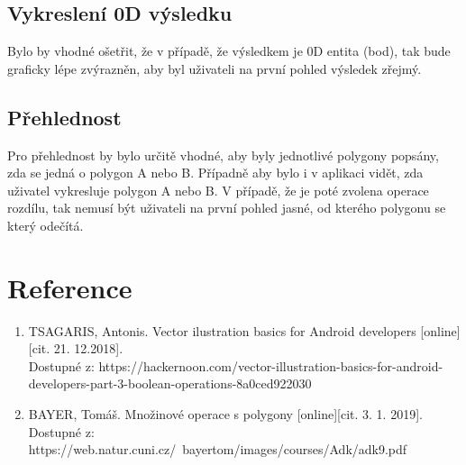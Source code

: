 \documentclass[a4paper, 12pt]{article}
\begin{document}
\subsection{Vykreslení 0D výsledku}
Bylo by vhodné ošetřit, že v případě, že výsledkem je 0D entita (bod), tak bude graficky lépe zvýrazněn, aby byl uživateli na první pohled výsledek zřejmý.

\subsection{Přehlednost}
Pro přehlednost by bylo určitě vhodné, aby byly jednotlivé polygony popsány, zda se jedná o polygon A nebo B. Případně aby bylo i v aplikaci vidět, zda uživatel vykresluje polygon A nebo B. V případě, že je poté zvolena operace rozdílu, tak nemusí být uživateli na první pohled jasné, od kterého polygonu se který odečítá.



\clearpage
\section{Reference}

\begin{enumerate}
\item TSAGARIS, Antonis. Vector ilustration basics for Android developers [online][cit. 21. 12.2018]. \\
Dostupné z: https://hackernoon.com/vector-illustration-basics-for-android-developers-part-3-boolean-operations-8a0ced922030 \\

\item  BAYER, Tomáš. Množinové operace s polygony [online][cit. 3. 1. 2019]. \\
Dostupné z: https://web.natur.cuni.cz/~bayertom/images/courses/Adk/adk9.pdf  \\


\end{enumerate}
\end{document}
